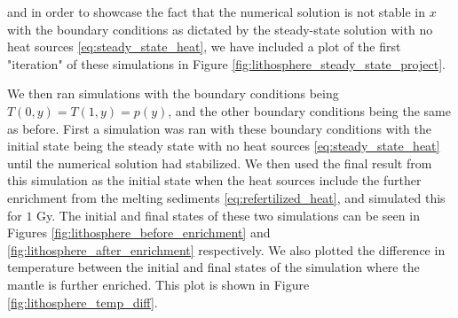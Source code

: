 \documentclass[reprint,english,notitlepage]{revtex4-1}  %
\begin{document}
and in order to showcase the fact that the numerical solution is not stable in $x$ with the boundary conditions as dictated by the steady-state solution with no heat sources \eqref{eq:steady_state_heat}, we have included a plot of the first "iteration" of these simulations in Figure \ref{fig:lithosphere_steady_state_project}.

We then ran simulations with the boundary conditions being $T(0,y) = T(1,y) = p(y)$, and the other boundary conditions being the same as before. First a simulation was ran with these boundary conditions with the initial state being the steady state with no heat sources \eqref{eq:steady_state_heat} until the numerical solution had stabilized. We then used the final result from this simulation as the initial state when the heat sources include the further enrichment from the melting sediments \eqref{eq:refertilized_heat}, and simulated this for $1$ Gy. The initial and final states of these two simulations can be seen in Figures \ref{fig:lithosphere_before_enrichment} and \ref{fig:lithosphere_after_enrichment} respectively. We also plotted the difference in temperature between the initial and final states of the simulation where the mantle is further enriched. This plot is shown in Figure \ref{fig:lithosphere_temp_diff}.
\end{document}
